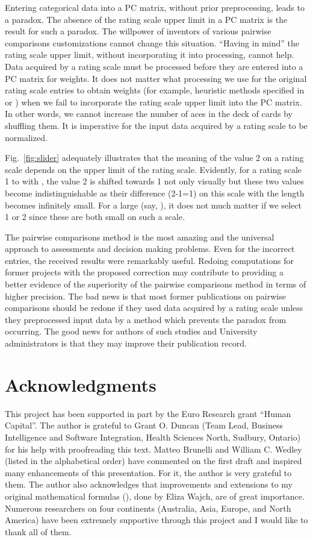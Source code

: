 \documentclass [12pt]{article}
\begin{document}
Entering categorical data into a PC matrix, without prior preprocessing, leads to a paradox. The absence of the rating scale upper limit in a PC matrix is the result for such a paradox. The willpower of inventors of various pairwise comparisons customizations   cannot change this situation. ``Having in mind'' the rating scale upper limit, without incorporating it into processing, cannot help. Data acquired by a rating scale must be processed before they are entered into a PC matrix for weights.
It does not matter what processing we use for the original rating scale entries to obtain weights (for example, heuristic methods specified in \cite{GM} or \cite{KK}) when we fail to incorporate the rating scale upper limit into the PC matrix. In other words, we cannot increase the number of aces in the deck of cards by shuffling them. It is imperative for the input data acquired by a rating scale to be normalized. 

Fig.~\ref{fig:slider} adequately illustrates that the meaning of the value 2 on a rating scale depends on the upper limit of the rating scale. Evidently, for a rating scale 1 to  with , the value 2 is shifted towards 1 not only visually but these two values become indistinguishable as their difference (2-1=1) on this scale with the length  becomes infinitely small. For a large  (say, ), it does not much matter if we select 1 or 2 since these are both small on such a scale.

The pairwise comparisons method is the most amazing and the universal approach to assessments and decision making problems. Even for the incorrect entries, the received results were remarkably useful. Redoing computations for former projects with the proposed correction may contribute to providing a better evidence of the superiority of the pairwise comparisons method in terms of higher precision. The bad news is that most former publications on pairwise comparisons should be redone if they used data acquired by a rating scale unless they preprocessed input data by a method which prevents the paradox from occurring. The good news for authors of such studies and University administrators is that they may improve their publication record.

\section*{Acknowledgments}
This project has been supported in part by the Euro Research grant ``Human Capital''. 
The author is grateful to Grant O. Duncan (Team Lead, Business Intelligence and Software Integration, Health Sciences North, Sudbury, Ontario) for his help with proofreading this text. Matteo Brunelli and William C. Wedley (listed in the alphabetical order) have commented on the first draft and inspired many enhancements of this presentation. For it, the author is very grateful to them. The author also acknowledges that improvements and extensions to my original mathematical formulas (\cite{EW}), done by Eliza Wajch, are of great importance. Numerous researchers on four continents (Australia, Asia, Europe, and North America) have been extremely supportive through this project and I would like to thank all of them.
\end{document}
